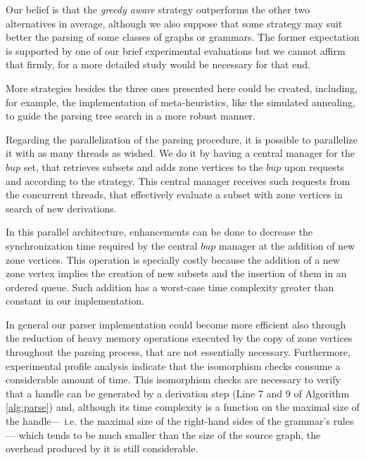 Our belief is that the \textit{greedy aware} strategy outperforms the other two alternatives in average, although we also suppose that some strategy may suit better the parsing of some classes of graphs or grammars. The former expectation is supported by one of our brief experimental evaluations but we cannot affirm that firmly, for a more detailed study would be necessary for that end.

More strategies besides the three ones presented here could be created, including, for example, the implementation of meta-heuristics, like the simulated annealing, to guide the parsing tree search in a more robust manner.

Regarding the parallelization of the parsing procedure, it is possible to parallelize it with as many threads as wished. We do it by having a central manager for the $bup$ set, that retrieves subsets and adds zone vertices to the $bup$ upon requests and according to the strategy. This central manager receives such requests from the concurrent threads, that effectively evaluate a subset with zone vertices in search of new derivations.

In this parallel architecture, enhancements can be done to decrease the synchronization time required by the central $bup$ manager at the addition of new zone vertices. This operation is specially costly because the addition of a new zone vertex implies the creation of new subsets and the insertion of them in an ordered queue. Such addition has a worst-case time complexity greater than constant in our implementation.

In general our parser implementation could become more efficient also through the reduction of heavy memory operations executed by the copy of zone vertices throughout the parsing process, that are not essentially necessary. Furthermore, experimental profile analysis indicate that the isomorphism checks consume a considerable amount of time. This isomorphism checks are necessary to verify that a handle can be generated by a derivation step (Line 7 and 9 of Algorithm \ref{alg:parse}) and, although its time complexity is a function on the maximal size of the handle--- i.e. the maximal size of the right-hand sides of the grammar's rules--- which tends to be much smaller than the size of the source graph, the overhead produced by it is still considerable. 

